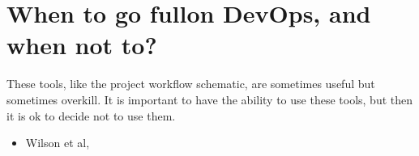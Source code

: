 \documentclass[letterpaper,10pt,english]{sphinxmanual}
\begin{document}
\section{When to go full\sphinxhyphen{}on DevOps, and when not to?}
\label{\detokenize{03CodersAtWork:when-to-go-full-on-devops-and-when-not-to}}
\sphinxAtStartPar
These tools, like the project workflow schematic, are sometimes useful but sometimes overkill. It is important to have the ability to use these tools, but then it is ok to decide not to use them.
\begin{itemize}
\item {} 
\sphinxAtStartPar
Wilson et al, 

\end{itemize}
\end{document}

